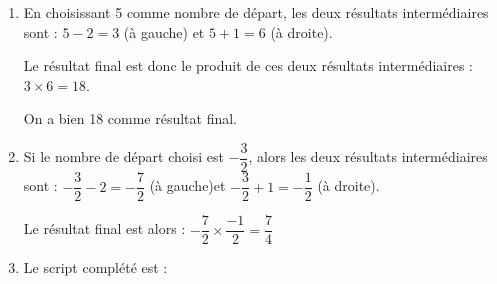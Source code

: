 \documentclass{article}
\begin{document}
\begin{enumerate}
	\item En choisissant 5 comme nombre de départ, les deux résultats intermédiaires sont : 
	$5 - 2 = 3 $ (à gauche) \quad et \quad$5 + 1 = 6$ (à droite).

Le résultat final est donc le produit de ces deux résultats intermédiaires :\quad $3\times 6 = 18$.

On a bien 18 comme résultat final.

	\item Si le nombre de départ choisi est $-\dfrac{3}{2}$, alors les deux résultats intermédiaires sont : \quad $-\dfrac{3}{2} - 2 = -\dfrac{7}{2}$  (à gauche)\quad et \quad $-\dfrac{3}{2} + 1 = -\dfrac{1}{2}$ (à droite).

Le résultat final est alors : \quad $-\dfrac{7}{2}\times \dfrac{-1}{2} = \dfrac{7}{4}$

	\item Le script complété est :
	\begin{center}
		\begin{scratch}
		\end{scratch}
	\end{center}

\end{enumerate}
\end{document}
